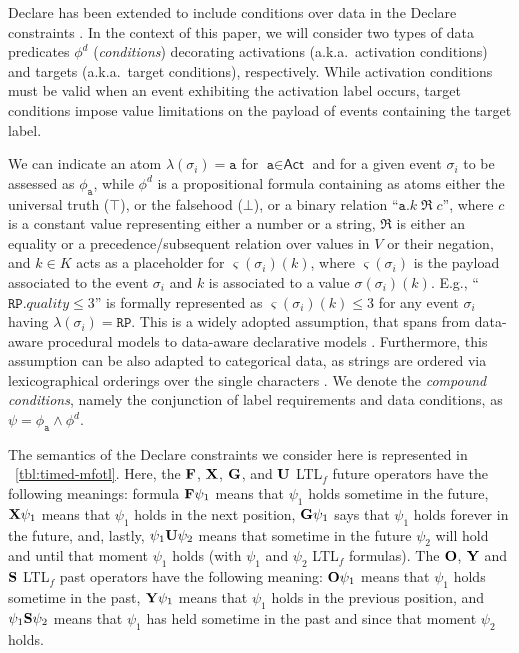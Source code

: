 Declare has been extended to include conditions over data in the Declare constraints \cite{}. In the context of this paper, we will consider two types of data predicates $\phi^d$ (\textit{conditions}) decorating activations (a.k.a.\ activation conditions) and targets (a.k.a.\ target conditions), respectively.
While activation conditions must be valid when an event exhibiting the activation label occurs, target conditions impose value limitations on the payload of events containing the target label. 


We can indicate an atom $\lambda(\sigma_i)=\texttt{a}$ for $\texttt{a}\in\textsf{Act}$ and for a given event $\sigma_i$ to be assessed as $\phi_\texttt{a}$, while $\phi^d$ is a propositional formula containing as atoms either the universal truth ($\top$), or the falsehood ($\bot$), or a binary relation ``$\texttt{a}.k\;\Re\;c$'', where $c$ is a constant value representing either a number or a string, $\Re$ is either an equality or a precedence/subsequent relation over values in $V$ or their negation, and $k\in K$ acts as a placeholder for $\varsigma(\sigma_i)(k)$, where $\varsigma(\sigma_i)$ is the payload associated to the event $\sigma_i$ and $k$ is associated to a value $\sigma(\sigma_i)(k)$. E.g., ``$\texttt{RP}.\textit{quality}\leq 3$'' is formally represented as $\varsigma(\sigma_i)(k)\leq 3$ for any event $\sigma_i$ having $\lambda(\sigma_i)=\texttt{RP}$.  This is a widely adopted assumption, that spans from data-aware procedural models \cite{MultiPerspective} to data-aware declarative models \cite{10.1007/978-3-642-40176-3_8}. Furthermore, this assumption can be also adapted to categorical data, as strings are ordered via lexicographical orderings over the single characters \cite{MultiPerspective}. We denote the \textit{compound conditions}, namely the conjunction of label requirements and data conditions, as $\psi=\phi_{\texttt{a}}\wedge \phi^d$.



The semantics of the Declare constraints we consider here is represented in \tablename~\ref{tbl:timed-mfotl}.
Here, the $\mathbf{F}$, $\mathbf{X}$, $\mathbf{G}$, and $\mathbf{U}$ LTL$_f$ future operators have the following meanings: formula $\mathbf{F} \psi_1$ means that $\psi_1$ holds sometime in the future, $\mathbf{X} \psi_1$ means that $\psi_1$
holds in the next position, $\mathbf{G} \psi_1$ says that $\psi_1$ holds forever in the future, and, lastly, $\psi_1 \mathbf{U} \psi_2$ means that sometime in the future $\psi_2$ will hold and
until that moment $\psi_1$ holds (with $\psi_1$ and $\psi_2$ LTL$_f$ formulas).
The $\mathbf{O}$, $\mathbf{Y}$ and $\mathbf{S}$ LTL$_f$ past operators have the following meaning:
$\mathbf{O} \psi_1$ means that $\psi_1$ holds sometime in the past,
$\mathbf{Y} \psi_1$ means that $\psi_1$ holds in the previous position,
and $\psi_1 \mathbf{S} \psi_2$ means that $\psi_1$ has held sometime in the past and since that moment $\psi_2$ holds.

